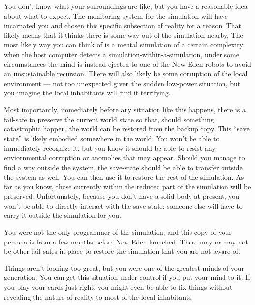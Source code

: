 \documentclass[char]{guildcamp1}
\begin{document}
You don't know what your surroundings are like, but you have a reasonable idea about what to expect. The monitoring system for the simulation will have incarnated you and chosen this specific subsection of reality for a reason. That likely means that it thinks there is some way out of the simulation nearby. The most likely way you can think of is a mental simulation of a certain complexity: when the host computer detects a simulation-within-a-simulation, under some circumstances the mind is instead ejected to one of the New Eden robots to avoid an unsustainable recursion. There will also likely be some corruption of the local environment --- not too unexpected given the sudden low-power situation, but you imagine the local inhabitants will find it terrifying.

Most importantly, immediately before any situation like this happens, there is a fail-safe to preserve the current world state so that, should something catastrophic happen, the world can be restored from the backup copy. This ``save state'' is likely embodied somewhere in the world. You won't be able to immediately recognize it, but you know it should be able to resist any enviornmental corruption or anomolies that may appear. Should you manage to find a way outside the system, the save-state should be able to transfer outside the system as well. You can then use it to restore the rest of the simulation. As far as you know, those currently within the reduced part of the simulation will be preserved. Unfortunately, because you don't have a solid body at present, you won't be able to directly interact with the save-state: someone else will have to carry it outside the simulation for you.

You were not the only programmer of the simulation, and this copy of your persona is from a few months before New Eden launched. There may or may not be other fail-safes in place to restore the simulation that you are not aware of.

Things aren't looking too great, but you were one of the greatest minds of your generation. You can get this situation under control if you put your mind to it. If you play your cards just right, you might even be able to fix things without revealing the nature of reality to most of the local inhabitants.
\end{document}
